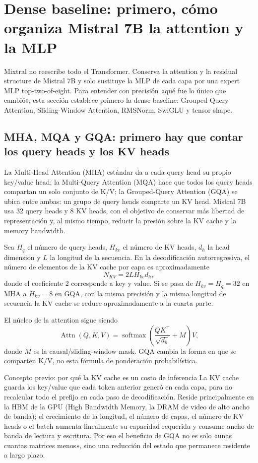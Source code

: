\section{Dense baseline: primero, cómo organiza Mistral 7B la attention y la MLP}

Mixtral no reescribe todo el Transformer. Conserva la attention y la residual structure de Mistral 7B y solo sustituye la MLP de cada capa por una expert MLP top-two-of-eight. Para entender con precisión «qué fue lo único que cambió», esta sección establece primero la dense baseline: Grouped-Query Attention, Sliding-Window Attention, RMSNorm, SwiGLU y tensor shape.

\subsection{MHA, MQA y GQA: primero hay que contar los query heads y los KV heads}

La Multi-Head Attention (MHA) estándar da a cada query head su propio key/value head; la Multi-Query Attention (MQA) hace que todos los query heads compartan un solo conjunto de K/V; la Grouped-Query Attention (GQA) se ubica entre ambas: un grupo de query heads comparte un KV head. Mistral 7B usa 32 query heads y 8 KV heads, con el objetivo de conservar más libertad de representación y, al mismo tiempo, reducir la presión sobre la KV cache y la memory bandwidth.


Sea $H_q$ el número de query heads, $H_{kv}$ el número de KV heads, $d_h$ la head dimension y $L$ la longitud de la secuencia. En la decodificación autorregresiva, el número de elementos de la KV cache por capa es aproximadamente
\[
N_{KV}=2L H_{kv}d_h,
\]
donde el coeficiente $2$ corresponde a key y value. Si se pasa de $H_{kv}=H_q=32$ en MHA a $H_{kv}=8$ en GQA, con la misma precisión y la misma longitud de secuencia la KV cache se reduce aproximadamente a la cuarta parte.

El núcleo de la attention sigue siendo
\[
\operatorname{Attn}(Q,K,V)=\operatorname{softmax}\!\left(\frac{QK^{\top}}{\sqrt{d_h}}+M\right)V,
\]
donde $M$ es la causal/sliding-window mask. GQA cambia la forma en que se comparten K/V, no esta fórmula de ponderación probabilística.

\begin{knowledgebox}{Concepto previo: por qué la KV cache es un costo de inferencia}
La KV cache guarda los key/value que cada token anterior generó en cada capa, para no recalcular todo el prefijo en cada paso de decodificación. Reside principalmente en la HBM de la GPU (High Bandwidth Memory, la DRAM de video de alto ancho de banda); el crecimiento de la longitud, el número de capas, el número de KV heads o el batch aumenta linealmente su capacidad requerida y consume ancho de banda de lectura y escritura. Por eso el beneficio de GQA no es solo «unas cuantas matrices menos», sino una reducción del estado que permanece residente a largo plazo.
\end{knowledgebox}

